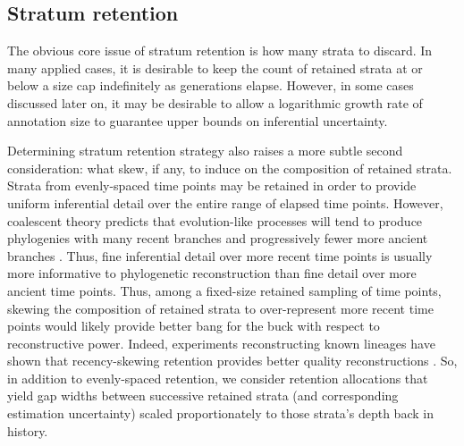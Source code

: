 

\subsection{Stratum retention}

The obvious core issue of stratum retention is how many strata to discard.
In many applied cases, it is desirable to keep the count of retained strata at or below a size cap indefinitely as generations elapse.
However, in some cases discussed later on, it may be desirable to allow a logarithmic growth rate of annotation size to guarantee upper bounds on inferential uncertainty.

Determining stratum retention strategy also raises a more subtle second consideration: what skew, if any, to induce on the composition of retained strata.
Strata from evenly-spaced time points may be retained in order to provide uniform inferential detail over the entire range of elapsed time points.
However, coalescent theory predicts that evolution-like processes will tend to produce phylogenies with many recent branches and progressively fewer more ancient branches \citep{nordborgCoalescentTheory2019, berestyckiRecentProgressCoalescent2009}.
Thus, fine inferential detail over more recent time points is usually more informative to phylogenetic reconstruction than fine detail over more ancient time points.
Thus, among a fixed-size retained sampling of time points, skewing the composition of retained strata to over-represent more recent time points would likely provide better bang for the buck with respect to reconstructive power.
Indeed, experiments reconstructing known lineages have shown that recency-skewing retention provides better quality reconstructions \citep{moreno2022hereditary}.
So, in addition to evenly-spaced retention, we consider retention allocations that yield gap widths between successive retained strata (and corresponding estimation uncertainty) scaled proportionately to those strata's depth back in history.

